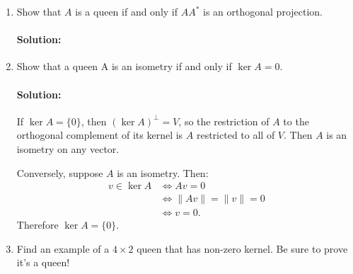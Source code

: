 \documentclass{article}
\begin{document}
\begin{enumerate}
\begin{enumerate}[label= (\alph*)]
\item Show that $A$ is a queen if and only if $AA^*$ is an orthogonal projection.
    \paragraph{Solution: }%

    \iffalse
    Suppose that $A$ is a queen. 
    Conversely, suppose that $AA^*$ is an orthogonal projection. Then let $v\in (\ker A)^{\perp}$. So we have some $w$, where  $A^* w=v$.
    \begin{align*}
        \|Av\|^2&= \langle Av,Av \rangle \\
        &= \langle A A^* w,A A^* w \rangle \\
        &= \langle A^* A A^* w, A^* w \rangle \\
        &= \langle AA^* A A^* w,  w \rangle \\
        &= \langle  A A^* w,  w \rangle \\
        &= \langle   A^* w,  A^* w \rangle \\
        &= \langle   v, v \rangle \\
        &= \|v\|^2\\
        \|Av\|&=\|v\|
    .\end{align*}%
\fi

\item Show that a queen A is an isometry if and only if $\ker A = {0}$.

    \paragraph{Solution: }If $\ker A=\{0\} $, then $(\ker A)^{\perp}=V$, so the restriction of $A$ to the orthogonal complement of its kernel is $A$ restricted to all of $V$. Then $A$ is an isometry on any vector.

    Conversely, suppose $A$ is an isometry. Then:
    \begin{align*}
        v\in \ker A&\iff Av=0\\
                   &\iff \|Av\|=\|v\|=0\\
                   &\iff v=0
    .\end{align*}
    Therefore $\ker A=\{0\} $. 

\item Find an example of a $4 \times  2$ queen that has non-zero kernel. Be sure to prove it's a queen!

\end{enumerate}
\end{enumerate}
\end{document}
